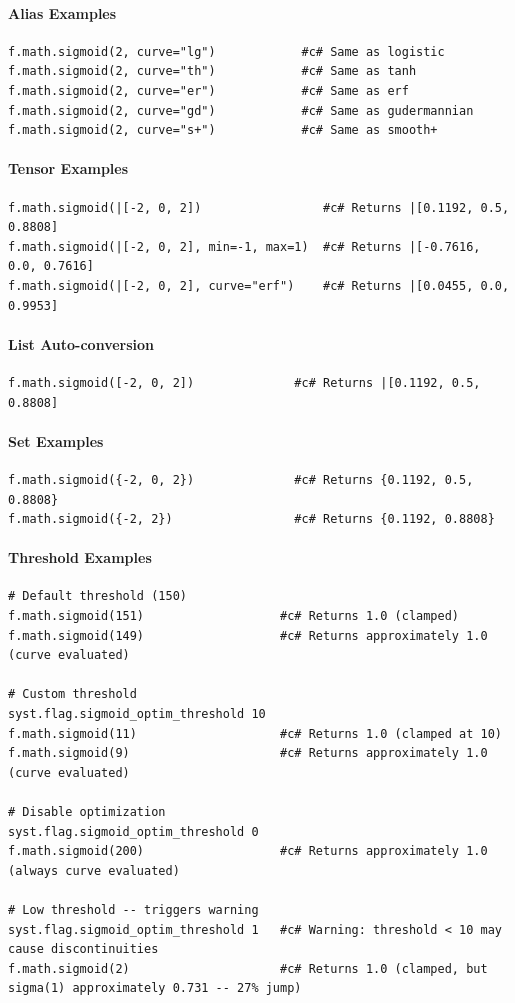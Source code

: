 \paragraph{Alias Examples}
\begin{verbatim}
f.math.sigmoid(2, curve="lg")            #c# Same as logistic
f.math.sigmoid(2, curve="th")            #c# Same as tanh
f.math.sigmoid(2, curve="er")            #c# Same as erf
f.math.sigmoid(2, curve="gd")            #c# Same as gudermannian
f.math.sigmoid(2, curve="s+")            #c# Same as smooth+
\end{verbatim}

\paragraph{Tensor Examples}
\begin{verbatim}
f.math.sigmoid(|[-2, 0, 2])                 #c# Returns |[0.1192, 0.5, 0.8808]
f.math.sigmoid(|[-2, 0, 2], min=-1, max=1)  #c# Returns |[-0.7616, 0.0, 0.7616]
f.math.sigmoid(|[-2, 0, 2], curve="erf")    #c# Returns |[0.0455, 0.0, 0.9953]
\end{verbatim}

\paragraph{List Auto-conversion}
\begin{verbatim}
f.math.sigmoid([-2, 0, 2])              #c# Returns |[0.1192, 0.5, 0.8808]
\end{verbatim}

\paragraph{Set Examples}
\begin{verbatim}
f.math.sigmoid({-2, 0, 2})              #c# Returns {0.1192, 0.5, 0.8808}
f.math.sigmoid({-2, 2})                 #c# Returns {0.1192, 0.8808}
\end{verbatim}

\paragraph{Threshold Examples}
\begin{verbatim}
# Default threshold (150)
f.math.sigmoid(151)                   #c# Returns 1.0 (clamped)
f.math.sigmoid(149)                   #c# Returns approximately 1.0 (curve evaluated)

# Custom threshold
syst.flag.sigmoid_optim_threshold 10
f.math.sigmoid(11)                    #c# Returns 1.0 (clamped at 10)
f.math.sigmoid(9)                     #c# Returns approximately 1.0 (curve evaluated)

# Disable optimization
syst.flag.sigmoid_optim_threshold 0
f.math.sigmoid(200)                   #c# Returns approximately 1.0 (always curve evaluated)

# Low threshold -- triggers warning
syst.flag.sigmoid_optim_threshold 1   #c# Warning: threshold < 10 may cause discontinuities
f.math.sigmoid(2)                     #c# Returns 1.0 (clamped, but sigma(1) approximately 0.731 -- 27% jump)
\end{verbatim}

